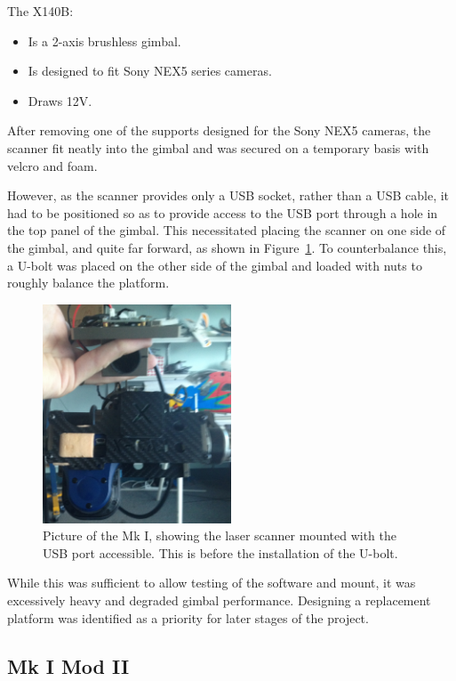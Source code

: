 \documentclass[12pt,oneside,a4paper,draft]{book}
\begin{document}
The X140B:
\begin{itemize}
\item Is a 2-axis brushless gimbal.
\item Is designed to fit Sony NEX5 series cameras.
\item Draws 12V.
\end{itemize}

After removing one of the supports designed for the Sony NEX5 cameras,
the scanner fit neatly into the gimbal and was secured on a temporary
basis with velcro and foam.

However, as the scanner provides only a USB socket, rather than a USB
cable, it had to be positioned so as to provide access to the USB port
through a hole in the top panel of the gimbal. This necessitated
placing the scanner on one side of the gimbal, and quite far forward,
as shown in Figure~\ref{fig:mk1-mount}. To counterbalance this, a
U-bolt was placed on the other side of the gimbal and loaded with nuts
to roughly balance the platform.

\begin{figure}[h!]
  \centering
  \includegraphics[width=0.5\textwidth]{figs/mk1-mount}
  \caption{Picture of the Mk I, showing the laser scanner mounted with the USB port accessible. This is before the installation of the U-bolt.}
  \label{fig:mk1-mount}
\end{figure}

While this was sufficient to allow testing of the software and mount,
it was excessively heavy and degraded gimbal performance. Designing a
replacement platform was identified as a priority for later stages of the project.

\subsection{Mk I Mod II}
\label{sec:mk-ib}
\end{document}
